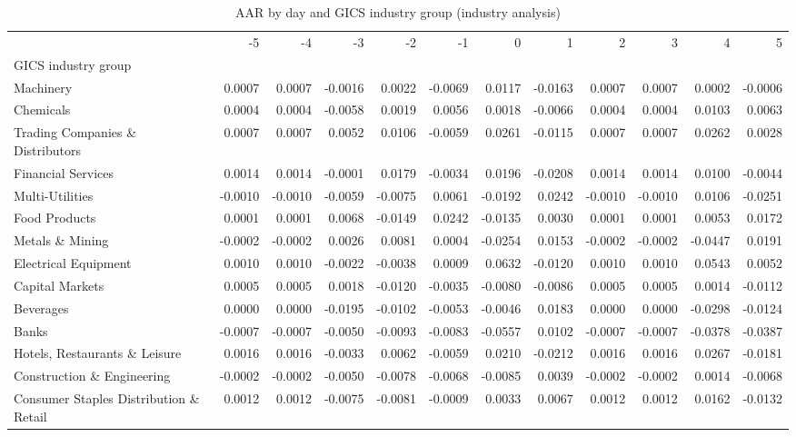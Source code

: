 \begin{table}
\caption{AAR by day and GICS industry group (industry analysis)}
\label{tab:industry_aar}
\begin{tabular}{lrrrrrrrrrrr}
\toprule
 & -5 & -4 & -3 & -2 & -1 & 0 & 1 & 2 & 3 & 4 & 5 \\
GICS industry group &  &  &  &  &  &  &  &  &  &  &  \\
\midrule
Machinery & 0.0007 & 0.0007 & -0.0016 & 0.0022 & -0.0069 & 0.0117 & -0.0163 & 0.0007 & 0.0007 & 0.0002 & -0.0006 \\
Chemicals & 0.0004 & 0.0004 & -0.0058 & 0.0019 & 0.0056 & 0.0018 & -0.0066 & 0.0004 & 0.0004 & 0.0103 & 0.0063 \\
Trading Companies \& Distributors & 0.0007 & 0.0007 & 0.0052 & 0.0106 & -0.0059 & 0.0261 & -0.0115 & 0.0007 & 0.0007 & 0.0262 & 0.0028 \\
Financial Services & 0.0014 & 0.0014 & -0.0001 & 0.0179 & -0.0034 & 0.0196 & -0.0208 & 0.0014 & 0.0014 & 0.0100 & -0.0044 \\
Multi-Utilities & -0.0010 & -0.0010 & -0.0059 & -0.0075 & 0.0061 & -0.0192 & 0.0242 & -0.0010 & -0.0010 & 0.0106 & -0.0251 \\
Food Products & 0.0001 & 0.0001 & 0.0068 & -0.0149 & 0.0242 & -0.0135 & 0.0030 & 0.0001 & 0.0001 & 0.0053 & 0.0172 \\
Metals \& Mining & -0.0002 & -0.0002 & 0.0026 & 0.0081 & 0.0004 & -0.0254 & 0.0153 & -0.0002 & -0.0002 & -0.0447 & 0.0191 \\
Electrical Equipment & 0.0010 & 0.0010 & -0.0022 & -0.0038 & 0.0009 & 0.0632 & -0.0120 & 0.0010 & 0.0010 & 0.0543 & 0.0052 \\
Capital Markets & 0.0005 & 0.0005 & 0.0018 & -0.0120 & -0.0035 & -0.0080 & -0.0086 & 0.0005 & 0.0005 & 0.0014 & -0.0112 \\
Beverages & 0.0000 & 0.0000 & -0.0195 & -0.0102 & -0.0053 & -0.0046 & 0.0183 & 0.0000 & 0.0000 & -0.0298 & -0.0124 \\
Banks & -0.0007 & -0.0007 & -0.0050 & -0.0093 & -0.0083 & -0.0557 & 0.0102 & -0.0007 & -0.0007 & -0.0378 & -0.0387 \\
Hotels, Restaurants \& Leisure & 0.0016 & 0.0016 & -0.0033 & 0.0062 & -0.0059 & 0.0210 & -0.0212 & 0.0016 & 0.0016 & 0.0267 & -0.0181 \\
Construction \& Engineering & -0.0002 & -0.0002 & -0.0050 & -0.0078 & -0.0068 & -0.0085 & 0.0039 & -0.0002 & -0.0002 & 0.0014 & -0.0068 \\
Consumer Staples Distribution \& Retail & 0.0012 & 0.0012 & -0.0075 & -0.0081 & -0.0009 & 0.0033 & 0.0067 & 0.0012 & 0.0012 & 0.0162 & -0.0132 \\

\end{tabular}
\end{table}
